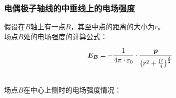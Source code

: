 \documentclass[UTF8]{ctexart}
\newcommand*{\veb}[1]{\vb*{#1}}
\begin{document}
\newpage

\subsubsection{电偶极子轴线的中垂线上的电场强度}
    \setcounter{equation}{0}
    假设在$B$轴上有一点$B$，其至中点的距离的大小为$r$。\\[3mm]
    场点$B$处的电场强度的计算公式：
    \begin{large}
        \begin{equation*}
            \veb{E_B}=-\frac{1}{4\pi\cdot\varepsilon_0}\cdot\frac{\veb{p}}{\left(r^2+\frac{l^2}{4}\right)^{\frac{3}{2}}}
        \end{equation*}
    \end{large}\\
    场点$B$在中心上侧时的电场强度情况：
\end{document}
